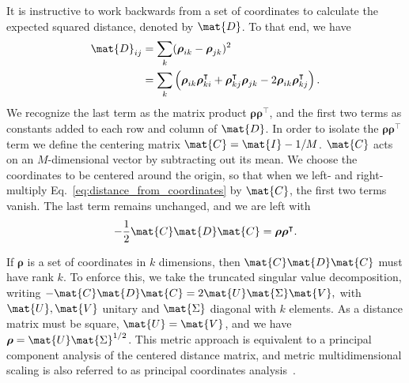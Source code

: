 \begin{bibunit}
It is instructive to work backwards from a set of coordinates to calculate the expected squared distance, denoted by $\mat{D}$.  To that end, we have
\begin{equation}
\label{eq:distance_from_coordinates}
\begin{aligned}
  \mat{D}_{ij} &= \sum_k (\boldsymbol{\rho}_{ik} - \boldsymbol{\rho}_{jk})^2\\
          &= \sum_k\left( \boldsymbol{\rho}_{ik}\boldsymbol{\rho}^{\intercal}_{ki} + \boldsymbol{\rho}^{\intercal}_{kj}\boldsymbol{\rho}_{jk} - 2\boldsymbol{\rho}_{ik}\boldsymbol{\rho}^{\intercal}_{kj}\right).
\end{aligned}
\end{equation}
We recognize the last term as the matrix product $\boldsymbol{\rho}\boldsymbol{\rho}^{\intercal}$, and the first two terms as constants added to each row and column of $\mat{D}$.  In order to isolate the $\boldsymbol{\rho}\boldsymbol{\rho}^{\intercal}$ term we define the centering matrix $\mat{C} = \mat{I} - 1/M$.  $\mat{C}$ acts on an $M$-dimensional vector by subtracting out its mean.  We choose the coordinates to be centered around the origin, so that when we left- and right-multiply Eq.~\eqref{eq:distance_from_coordinates} by $\mat{C}$, the first two terms vanish.  The last term remains unchanged, and we are left with
\begin{equation}
-\frac{1}{2}\mat{C}\mat{D}\mat{C}
  = \boldsymbol{\rho}\boldsymbol{\rho}^{\intercal}.
\end{equation}

If $\boldsymbol{\rho}$ is a set of coordinates in $k$ dimensions, then $\mat{C}\mat{D}\mat{C}$ must have rank $k$.  To enforce this, we take the truncated singular value decomposition, writing $-\mat{C}\mat{D}\mat{C} = 2\mat{U}\mat{\Sigma}\mat{V},$ with $\mat{U}, \mat{V}$ unitary and $\mat{\Sigma}$ diagonal with $k$ elements.  As a distance matrix must be square, $\mat{U} = \mat{V}$, and we have $\boldsymbol{\rho} = \mat{U}\mat{\Sigma}^{1/2}$.  This metric approach is equivalent to a principal component analysis of the centered distance matrix, and metric multidimensional scaling is also referred to as principal coordinates analysis~\cite{gower2014principal}.


\end{bibunit}
